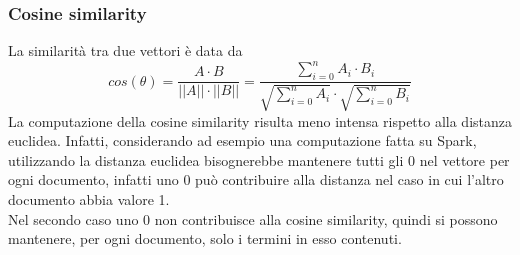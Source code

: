 \subsubsection{Cosine similarity}
La similarità tra due vettori è data da
$$
    cos(\theta) = \frac{A \cdot B}{||A||  \cdot  ||B||} = 
    \frac{\sum_{i=0}^{n} A_i \cdot B_i}{\sqrt{\sum_{i=0}^{n} A_i}  \cdot  \sqrt{\sum_{i=0}^{n} B_i}}
$$
La computazione della cosine similarity risulta meno intensa rispetto alla distanza euclidea.
Infatti, considerando ad esempio una computazione fatta su Spark, utilizzando la 
distanza euclidea bisognerebbe mantenere tutti gli 0 nel vettore per ogni documento, infatti 
uno 0 può contribuire alla distanza nel caso in cui l'altro documento abbia valore 1. \\
Nel secondo 
caso uno 0 non contribuisce alla cosine similarity, quindi si possono mantenere, per ogni documento, 
solo i termini in esso contenuti.